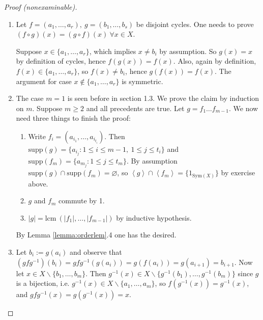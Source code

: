 \documentclass[a4paper]{article}
\newcommand{\la}{\left\langle}
\newcommand{\ra}{\right\rangle}
\newcommand{\Sym}{\text{Sym}}
\newcommand{\supp}{\text{supp}}
\newcommand{\lcm}{\text{lcm}\ }
\theoremstyle{definition}
\begin{document}
\begin{proof}[Proof (nonexaminable)]
\begin{enumerate}
\item Let $f=(a_1,\ldots,a_r),\ g=(b_1,\ldots,b_s)$ be disjoint cycles. One needs to prove $(f\circ g)(x)=(g\circ f)(x) \ \forall x\in X$.

Suppose $x\in\{a_1,\ldots,a_r\}$, which implies $x\neq b_i$ by assumption. So $g(x)=x$ by definition of cycles, hence $f(g(x))=f(x)$. Also, again by definition, $f(x)\in\{a_1,\ldots,a_r\}$, so $f(x)\neq b_i$, hence $g(f(x))=f(x)$. The argument for case $x\notin \{a_1,\ldots,a_r\}$ is symmetric.
\item The case $m=1$ is seen before in section 1.3. We prove the claim by induction on $m$. Suppose $m\geq 2$ and all precedents are true. Let $g=f_1\ldots f_{m-1}$. We now need three things to finish the proof:
\begin{enumerate}
\item Write $f_i=(a_{i_1},\ldots,a_{i_{t_i}})$. Then $\supp(g)=\{a_{i_j}:1\leq i\leq m-1,\ 1\leq j\leq t_i\}$ and $\supp(f_m)=\{a_{m_j}:1\leq j\leq t_m\}$. By assumption $\supp(g)\cap\supp(f_m)=\varnothing$, so $\la g\ra \cap \la f_m\ra=\{1_{\Sym(X)}\}$ by exercise above.
\item $g$ and $f_m$ commute by 1.
\item $|g|=\lcm(|f_1|,\ldots,|f_{m-1}|)$ by inductive hypothesis.
\end{enumerate}
By Lemma \ref{lemma:orderlem}.4 one has the desired.
\item Let $b_i:=g(a_i)$ and observe that $(gfg^{-1})(b_i)=gfg^{-1}(g(a_i))=g(f(a_i))=g(a_{i+1})=b_{i+1}$. Now let $x\in X\backslash\{b_1,\ldots,b_m\}$. Then $g^{-1}(x)\in X\backslash\{g^{-1}(b_1),\ldots,g^{-1}(b_m)\}$ since $g$ is a bijection, i.e. $g^{-1}(x)\in X\backslash\{a_1,\ldots,a_m\}$, so $f(g^{-1}(x))=g^{-1}(x)$, and $gfg^{-1}(x)=g(g^{-1}(x))=x$.
\end{enumerate}
\end{proof}
\end{document}
